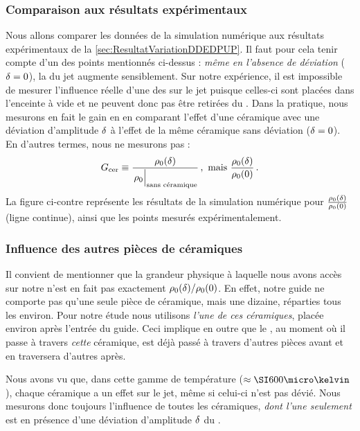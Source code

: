 \subsubsection{Comparaison aux résultats expérimentaux}

Nous allons comparer les données de la simulation numérique aux résultats expérimentaux de la \autoref{sec:ResultatVariationDDEDPUP}. Il faut pour cela tenir compte d'un des points mentionnés ci-dessus : 
\emph{même en l'absence de déviation} (${\delta}=0$), la \ddedpup du jet augmente sensiblement.
Sur notre expérience, il est impossible de mesurer l'influence réelle d'une des \pdecs sur le jet puisque celles-ci sont placées dans l'enceinte à vide et ne peuvent donc pas être retirées du \setup. 
\noindent Dans la pratique, nous mesurons en fait le gain en \ddedpup en comparant l'effet d'une céramique avec une déviation d'amplitude ${\delta}$ à l'effet de la même céramique sans déviation (${\delta}=0$). En d'autres termes, nous ne mesurons pas :
\[
\GainCeram 
\equiv \frac{\rhojetaxe(\Devi)}{\AvecTexte{\rhojetaxe}{sans céramique}}
\virguleformule
\mbox{ mais }\frac{\rhojetaxe(\Devi)}{\rhojetaxe(0)}
\pointformule
\]
\noindent La figure ci-contre représente les résultats de la simulation numérique pour  $\tfrac{{\rho_{0}}({\delta})}{{\rho_{0}}(0)}$ (ligne continue), ainsi que les points mesurés expérimentalement.


\casse


\subsubsection{Influence des autres pièces de céramiques}
Il convient de mentionner que la grandeur physique à laquelle nous avons accès sur notre \setup n'est en fait pas exactement ${{{\rho_{0}}({\delta})} / {{\rho_{0}}(0)}}$. En effet, notre guide ne comporte pas qu'une seule pièce de céramique, mais une dizaine, réparties tous les  environ. 
Pour notre étude nous utilisons \emph{l'une de ces céramiques}, placée environ  après l'entrée du guide. Ceci implique en outre que le \jat, au moment où il passe à travers \emph{cette} céramique, est déjà passé à travers d'autres pièces avant et en traversera d'autres après. 

\Resultat
{
Nous avons vu que, dans cette gamme de température ($\approx\microK{600}$), chaque céramique a un effet sur le jet, même si celui-ci n'est pas dévié. 
Nous mesurons donc toujours l'influence de toutes les céramiques, \emph{dont l'une seulement} est en présence d'une déviation d'amplitude ${\delta}$ du \jat. 
}

